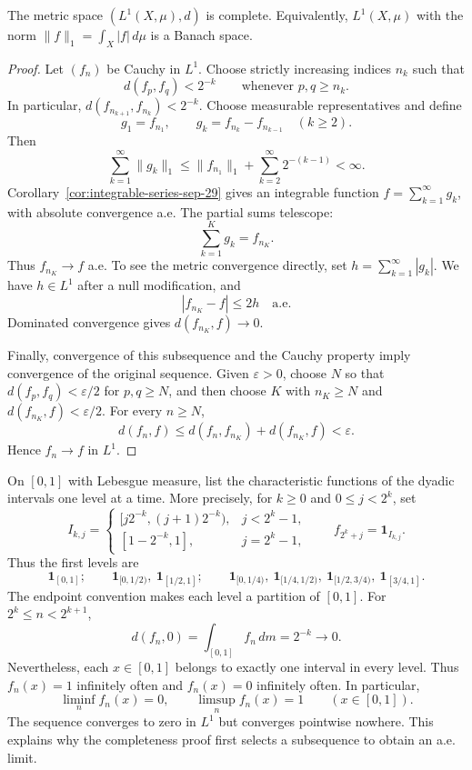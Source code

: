 \begin{theorem}\label{thm:l1-complete-sep-29}
  The metric space $(L^1(X,\mu),d)$ is complete. Equivalently,
  $L^1(X,\mu)$ with the norm $\|f\|_1=\int_X|f|\,d\mu$ is a
  Banach space.
\end{theorem}

\begin{proof}
  Let $(f_n)$ be Cauchy in $L^1$. Choose strictly increasing indices
  $n_k$ such that
  \[
    d(f_p,f_q)<2^{-k}\qquad\text{whenever }p,q\geq n_k.
  \]
  In particular, $d(f_{n_{k+1}},f_{n_k})<2^{-k}$. Choose measurable
  representatives and define
  \[
    g_1=f_{n_1},\qquad
    g_k=f_{n_k}-f_{n_{k-1}}\quad(k\geq2).
  \]
  Then
  \[
    \sum_{k=1}^{\infty}\|g_k\|_1
      \leq\|f_{n_1}\|_1+\sum_{k=2}^{\infty}2^{-(k-1)}<\infty.
  \]
  Corollary~\ref{cor:integrable-series-sep-29} gives an integrable
  function $f=\sum_{k=1}^{\infty}g_k$, with absolute convergence
  a.e. The partial sums telescope:
  \[
    \sum_{k=1}^K g_k=f_{n_K}.
  \]
  Thus $f_{n_K}\to f$ a.e. To see the metric convergence directly,
  set $h=\sum_{k=1}^{\infty}|g_k|$. We have $h\in L^1$ after a
  null modification, and
  \[
    |f_{n_K}-f|\leq2h\quad\text{a.e.}
  \]
  Dominated convergence gives $d(f_{n_K},f)\to0$.

  Finally, convergence of this subsequence and the Cauchy property
  imply convergence of the original sequence. Given $\varepsilon>0$,
  choose $N$ so that $d(f_p,f_q)<\varepsilon/2$ for $p,q\geq N$,
  and then choose $K$ with $n_K\geq N$ and
  $d(f_{n_K},f)<\varepsilon/2$. For every $n\geq N$,
  \[
    d(f_n,f)\leq d(f_n,f_{n_K})+d(f_{n_K},f)<\varepsilon.
  \]
  Hence $f_n\to f$ in $L^1$.
\end{proof}

\begin{example}
  \label{ex:typewriter-sep-29}
  On $[0,1]$ with Lebesgue measure, list the characteristic functions
  of the dyadic intervals one level at a time. More precisely, for
  $k\geq0$ and $0\leq j<2^k$, set
  \[
    I_{k,j}=
    \begin{cases}
      [j2^{-k},(j+1)2^{-k}),&j<2^k-1,\\
      [1-2^{-k},1],&j=2^k-1,
    \end{cases}
    \qquad f_{2^k+j}=\mathbf 1_{I_{k,j}}.
  \]
  Thus the first levels are
  \[
    \mathbf 1_{[0,1]};\qquad
    \mathbf 1_{[0,1/2)},\ \mathbf 1_{[1/2,1]};\qquad
    \mathbf 1_{[0,1/4)},\ \mathbf 1_{[1/4,1/2)},\
    \mathbf 1_{[1/2,3/4)},\ \mathbf 1_{[3/4,1]}.
  \]
  The endpoint convention makes each level a partition of $[0,1]$.
  For $2^k\leq n<2^{k+1}$,
  \[
    d(f_n,0)=\int_{[0,1]}f_n\,dm=2^{-k}\longrightarrow0.
  \]
  Nevertheless, each $x\in[0,1]$ belongs to exactly one interval in
  every level. Thus $f_n(x)=1$ infinitely often and $f_n(x)=0$
  infinitely often. In particular,
  \[
    \liminf_n f_n(x)=0,\qquad\limsup_n f_n(x)=1
    \qquad(x\in[0,1]).
  \]
  The sequence converges to zero in $L^1$ but converges pointwise
  nowhere. This explains why the completeness proof first selects a
  subsequence to obtain an a.e. limit.
\end{example}


